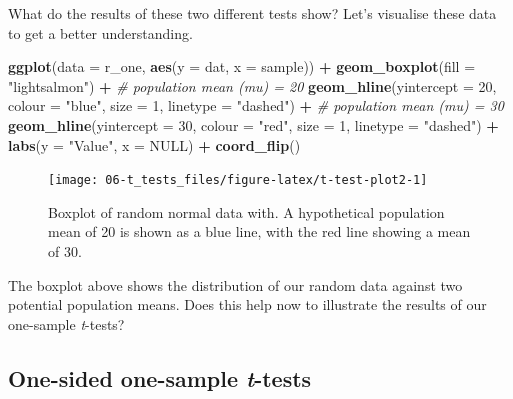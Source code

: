 \documentclass[english,10pt,a4paper,oneside]{book}
\newenvironment{Shaded}{\begin{snugshade}}{\end{snugshade}}
\newcommand{\CommentTok}[1]{\textcolor[rgb]{0.56,0.35,0.01}{\textit{#1}}}
\newcommand{\DataTypeTok}[1]{\textcolor[rgb]{0.13,0.29,0.53}{#1}}
\newcommand{\DecValTok}[1]{\textcolor[rgb]{0.00,0.00,0.81}{#1}}
\newcommand{\KeywordTok}[1]{\textcolor[rgb]{0.13,0.29,0.53}{\textbf{#1}}}
\newcommand{\NormalTok}[1]{#1}
\newcommand{\OperatorTok}[1]{\textcolor[rgb]{0.81,0.36,0.00}{\textbf{#1}}}
\newcommand{\OtherTok}[1]{\textcolor[rgb]{0.56,0.35,0.01}{#1}}
\newcommand{\StringTok}[1]{\textcolor[rgb]{0.31,0.60,0.02}{#1}}
\theoremstyle{definition}
\theoremstyle{definition}
\theoremstyle{definition}
\theoremstyle{remark}
\begin{document}
What do the results of these two different tests show? Let's visualise
these data to get a better understanding.

\begin{Shaded}
\begin{Highlighting}[]
\KeywordTok{ggplot}\NormalTok{(}\DataTypeTok{data =}\NormalTok{ r_one, }\KeywordTok{aes}\NormalTok{(}\DataTypeTok{y =}\NormalTok{ dat, }\DataTypeTok{x =}\NormalTok{ sample)) }\OperatorTok{+}
\StringTok{  }\KeywordTok{geom_boxplot}\NormalTok{(}\DataTypeTok{fill =} \StringTok{"lightsalmon"}\NormalTok{) }\OperatorTok{+}
\StringTok{  }\CommentTok{# population  mean (mu) = 20}
\StringTok{  }\KeywordTok{geom_hline}\NormalTok{(}\DataTypeTok{yintercept =} \DecValTok{20}\NormalTok{, }\DataTypeTok{colour =} \StringTok{"blue"}\NormalTok{, }
             \DataTypeTok{size =} \DecValTok{1}\NormalTok{, }\DataTypeTok{linetype =} \StringTok{"dashed"}\NormalTok{) }\OperatorTok{+}
\StringTok{  }\CommentTok{# population  mean (mu) = 30}
\StringTok{  }\KeywordTok{geom_hline}\NormalTok{(}\DataTypeTok{yintercept =} \DecValTok{30}\NormalTok{, }\DataTypeTok{colour =} \StringTok{"red"}\NormalTok{, }
             \DataTypeTok{size =} \DecValTok{1}\NormalTok{, }\DataTypeTok{linetype =} \StringTok{"dashed"}\NormalTok{) }\OperatorTok{+}
\StringTok{  }\KeywordTok{labs}\NormalTok{(}\DataTypeTok{y =} \StringTok{"Value"}\NormalTok{, }\DataTypeTok{x =} \OtherTok{NULL}\NormalTok{) }\OperatorTok{+}
\StringTok{  }\KeywordTok{coord_flip}\NormalTok{()}
\end{Highlighting}
\end{Shaded}

\begin{figure}
\texttt{[image: 06-t\_tests\_files/figure-latex/t-test-plot2-1]} \caption{Boxplot of random normal data with. A hypothetical population mean of 20 is shown as a blue line, with the red line showing a mean of 30.}\label{fig:t-test-plot2}
\end{figure}

The boxplot above shows the distribution of our random data against two
potential population means. Does this help now to illustrate the results
of our one-sample \emph{t}-tests?

\hypertarget{one-sided-one-sample-t-tests}{%
\subsection{\texorpdfstring{One-sided one-sample
\emph{t}-tests}{One-sided one-sample t-tests}}\label{one-sided-one-sample-t-tests}}
\end{document}
